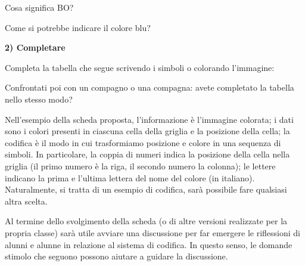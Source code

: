 \begin{scheda}[A2][5]
\label{scheda-codifica-2}
Cosa significa BO?\par
{}
\vspace{10mm}
Come si potrebbe indicare il colore blu?\par
{}
\vspace{10mm}
\textbf{2) Completare}\par
Completa la tabella che segue scrivendo i simboli o colorando l'immagine:\par
\vspace{4mm}
\noindent{}\par
\vspace{8mm}
Confrontati poi con un compagno o una compagna: avete completato la tabella nello stesso modo?\par
{}
\end{scheda}

Nell'esempio della scheda proposta, l'informazione è l'immagine colorata; i dati sono i colori presenti in ciascuna cella della griglia e la posizione della cella; la codifica è il modo in cui trasformiamo posizione e colore in una sequenza di simboli. In particolare, la coppia di numeri indica la posizione della cella nella griglia (il primo numero è la riga, il secondo numero la colonna); le lettere indicano la prima e l'ultima lettera del nome del colore (in italiano). Naturalmente, si tratta di un esempio di codifica, sarà possibile fare qualsiasi altra scelta.

Al termine dello svolgimento della scheda (o di altre versioni realizzate per la propria classe) sarà utile avviare una discussione per far emergere le riflessioni di alunni e alunne in relazione al sistema di codifica. In questo senso, le domande stimolo che seguono possono aiutare a guidare la discussione.

